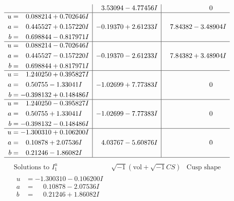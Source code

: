 \documentclass[1p]{elsarticle_modified}
\theoremstyle{definition}
\newcommand{\I}{\sqrt{-1}}
\begin{document}
$$\begin{array}{c|c|c}
 & \phantom{-}3.53094 - 4.77456 I & \phantom{-0.000000 } 0 \\ \hline\begin{aligned}
u &= \phantom{-}0.088214 + 0.702646 I \\
a &= \phantom{-}0.445527 + 0.157220 I \\
b &= \phantom{-}0.698844 - 0.817971 I\end{aligned}
 & -0.19370 + 2.61233 I & \phantom{-}7.84382 - 3.48904 I \\ \hline\begin{aligned}
u &= \phantom{-}0.088214 - 0.702646 I \\
a &= \phantom{-}0.445527 - 0.157220 I \\
b &= \phantom{-}0.698844 + 0.817971 I\end{aligned}
 & -0.19370 - 2.61233 I & \phantom{-}7.84382 + 3.48904 I \\ \hline\begin{aligned}
u &= \phantom{-}1.240250 + 0.395827 I \\
a &= \phantom{-}0.50755 - 1.33041 I \\
b &= -0.398132 + 0.148486 I\end{aligned}
 & -1.02699 + 7.77383 I & \phantom{-0.000000 } 0 \\ \hline\begin{aligned}
u &= \phantom{-}1.240250 - 0.395827 I \\
a &= \phantom{-}0.50755 + 1.33041 I \\
b &= -0.398132 - 0.148486 I\end{aligned}
 & -1.02699 - 7.77383 I & \phantom{-0.000000 } 0 \\ \hline\begin{aligned}
u &= -1.300310 + 0.106200 I \\
a &= \phantom{-}0.10878 + 2.07536 I \\
b &= \phantom{-}0.21246 - 1.86082 I\end{aligned}
 & \phantom{-}4.03767 - 5.60876 I & \phantom{-0.000000 } 0\\
 \hline 
 \end{array}$$\newpage$$\begin{array}{c|c|c}  
\text{Solutions to }I^u_{1}& \I (\text{vol} + \sqrt{-1}CS) & \text{Cusp shape}\\
 \hline 
\begin{aligned}
u &= -1.300310 - 0.106200 I \\
a &= \phantom{-}0.10878 - 2.07536 I \\
b &= \phantom{-}0.21246 + 1.86082 I\end{aligned}

\end{array}$$
\end{document}
